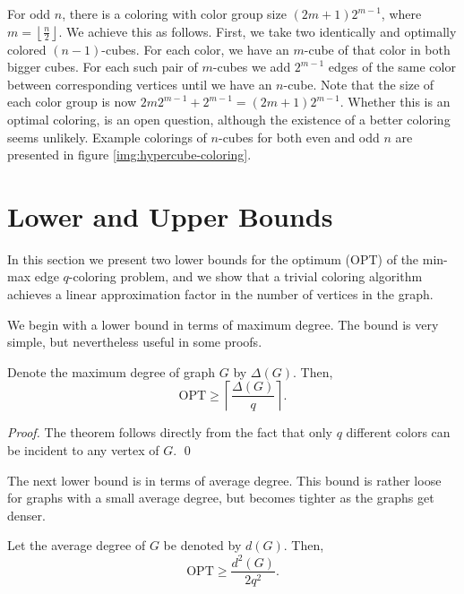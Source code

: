 \documentclass[runningheads, a4paper]{llncs}
\begin{document}
For odd $n$, there is a coloring with color group size $(2m + 1)2^{m-1}$, where $m = \left\lfloor \frac{n}{2} \right\rfloor$. We achieve this as follows. First, we take two identically and optimally colored $(n-1)$-cubes. For each color, we have an $m$-cube of that color in both bigger cubes. For each such pair of $m$-cubes we add $2^{m-1}$ edges of the same color between corresponding vertices until we have an $n$-cube. Note that the size of each color group is now $2m2^{m-1} + 2^{m-1} = (2m + 1)2^{m-1}$. Whether this is an optimal coloring, is an open question, although the existence of a better coloring seems unlikely. Example colorings of $n$-cubes for both even and odd $n$ are presented in figure \ref{img:hypercube-coloring}.


\section{Lower and Upper Bounds}\label{sect:lb-ub}

In this section we present two lower bounds for the optimum (OPT) of the min-max edge $q$-coloring problem, and we show that a trivial coloring algorithm achieves a linear approximation factor in the number of vertices in the graph.



We begin with a lower bound in terms of maximum degree. The bound is very simple, but nevertheless useful in some proofs.
\begin{theorem}\label{theorem:max-deg-lb}
Denote the maximum degree of graph $G$ by $\Delta(G)$. Then,
\begin{equation}
\textrm{OPT} \geq \left\lceil \frac{\Delta(G)}{q} \right\rceil.
\end{equation}
\end{theorem}
\begin{proof}
The theorem follows directly from the fact that only $q$ different colors can be incident to any vertex of $G$. \qed
\end{proof}



The next lower bound is in terms of average degree. This bound is rather loose for graphs with a small average degree, but becomes tighter as the graphs get denser.
\begin{theorem}\label{theorem:avg-deg-lb}
Let the average degree of $G$ be denoted by $d(G)$. Then,
\begin{displaymath}\label{eqn:avg-deg-lb}
\textrm{OPT} \geq \frac{d^2(G)}{2q^2}.
\end{displaymath}
\end{theorem}
\end{document}
